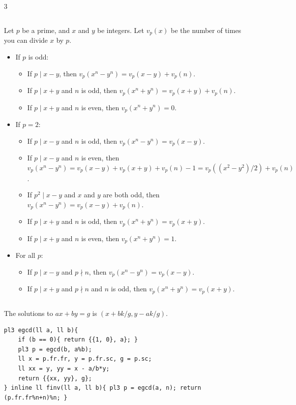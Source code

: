 \documentclass[landscape, 8pt, a4paper, oneside]{extarticle}
\begin{document}
\begin{multicols*}{3}
\subsection{}
Let $p$ be a prime, and $x$ and $y$ be integers. Let $v_p(x)$ be the number of times you can divide $x$ by $p$.
\begin{itemize}
	\item If $p$ is odd:
	\begin{itemize}
		\item If $p \mid x-y$, then $v_p(x^n - y^n) = v_p(x-y) + v_p(n)$.
		\item If $p \mid x+y$ and $n$ is odd, then $v_p(x^n + y^n) = v_p(x+y) + v_p(n)$.
		\item If $p \mid x+y$ and $n$ is even, then $v_p(x^n + y^n) = 0$.
	\end{itemize}
	\item If $p = 2$:
	\begin{itemize}
		\item If $p \mid x-y$ and $n$ is odd, then $v_p(x^n - y^n) = v_p(x-y)$.
		\item If $p \mid x-y$ and $n$ is even, then $v_p(x^n - y^n) = v_p(x-y) + v_p(x+y) + v_p(n) - 1 = v_p((x^2 - y^2)/2) + v_p(n)$.
		\item If $p^2 \mid x-y$ and $x$ and $y$ are both odd, then $v_p(x^n - y^n) = v_p(x-y) + v_p(n)$.
		\item If $p \mid x+y$ and $n$ is odd, then $v_p(x^n + y^n) = v_p(x+y)$.
		\item If $p \mid x+y$ and $n$ is even, then $v_p(x^n + y^n) = 1$.
	\end{itemize}
	\item For all $p$:
	\begin{itemize}
		\item If $p \mid x-y$ and $p \nmid n$, then $v_p(x^n - y^n) = v_p(x-y)$.
		\item If $p \mid x+y$ and $p \nmid n$ and $n$ is odd, then $v_p(x^n + y^n) = v_p(x+y)$.
	\end{itemize}
\end{itemize}
\subsection{}
The solutions to $ax + by = g$ is $(x + bk/g, y - ak/g)$.
\begin{verbatim}
pl3 egcd(ll a, ll b){
	if (b == 0){ return {{1, 0}, a}; }
	pl3 p = egcd(b, a%b);
	ll x = p.fr.fr, y = p.fr.sc, g = p.sc;
	ll xx = y, yy = x - a/b*y;
	return {{xx, yy}, g};
} inline ll finv(ll a, ll b){ pl3 p = egcd(a, n); return (p.fr.fr%n+n)%n; }
\end{verbatim}

\end{multicols*}
\end{document}
